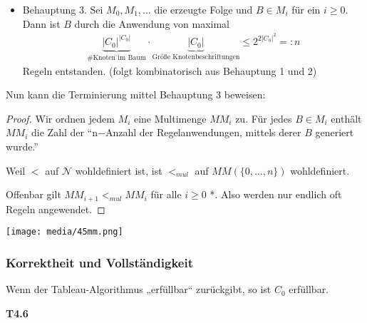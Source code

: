 \begin{itemize}
\item Behauptung 3.
  Sei $M_{0},M_1,\ldots$ die erzeugte Folge und $B \in M_i$ für
  ein $i \geq 0$. Dann ist $B$ durch die Anwendung von maximal
  \begin{align*}
      \underbrace{\left| C_{0} \right|^{\left| C_{0} \right|}}_\text{\# Knoten im Baum} \cdot \underbrace{\left| C_{0} \right|}_\text{Größe Knotenbeschriftungen} \leq 2^{2\left| C_{0} \right|^{2}} =: n
  \end{align*}
  Regeln entstanden. (folgt kombinatorisch aus Behauptung 1 und 2)

\end{itemize}

Nun kann die Terminierung mittel Behauptung 3 beweisen:

\begin{tafel}

\begin{proof}
    Wir ordnen jedem $M_i$ eine Multimenge $MM_i$ zu. Für jedes $B \in M_i$ enthält $MM_i$ die Zahl der \enquote{n$-$Anzahl der Regelanwendungen, mittels derer $B$ generiert wurde.}

Weil $<$ auf $\mathcal{N}$ wohldefiniert ist, ist $<_{mul}$ auf $MM(\{0,\ldots,n\})$ wohldefiniert.

Offenbar gilt $MM_{i+1} <_{mul} MM_i$ für alle $i \geq 0$ *. Also werden nur endlich oft Regeln angewendet.
\end{proof}

\texttt{[image: media/45mm.png]}
\end{tafel}

\subsubsection{Korrektheit und Vollständigkeit}

\begin{proposition}

Wenn der Tableau-Algorithmus „erfüllbar`` zurückgibt, so ist $C_{0}$
erfüllbar.
\end{proposition}

\textbf{T4.6}

